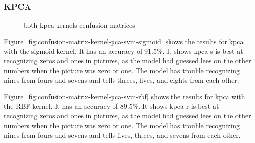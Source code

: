 \subsubsection{KPCA}
\begin{figure}
    \centering
    \qquad
    \caption{both \gls{kpca} kernels confusion matrices}
    \label{fig:kpca-kernels}
\end{figure}

Figure~\ref{fig:confusion-matrix-kernel-pca-svm-sigmoid} shows the results for \gls{kpca} with the sigmoid kernel. It has an accuracy of 91.5\%. It shows \gls{kpca-s} is best at recognizing zeros and ones in pictures, as the model had guessed lees on the other numbers when the picture was zero or one. The model has trouble recognizing nines from fours and sevens and tells threes, fives, and eights from each other. 

Figure~\ref{fig:confusion-matrix-kernel-pca-svm-rbf} shows the results for \gls{kpca} with the RBF kernel. It has an accuracy of 89.5\%. It shows \gls{kpca-r} is best at recognizing zeros and ones in pictures, as the model had guessed lees on the other numbers when the picture was zero or one. The model has trouble recognizing nines from fours and sevens and tells fives, threes, and sevens from each other.  

